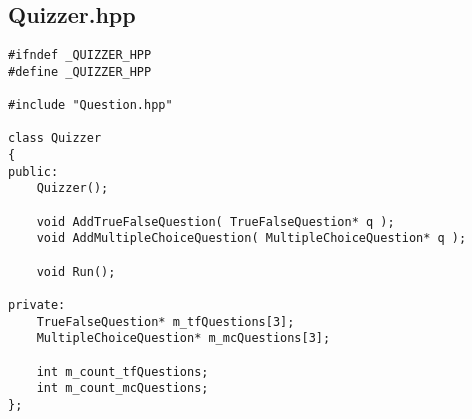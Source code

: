 \documentclass[a4paper,12pt]{book}
\begin{document}
            \subsection*{Quizzer.hpp}
\begin{lstlisting}[style=code]
#ifndef _QUIZZER_HPP
#define _QUIZZER_HPP

#include "Question.hpp"

class Quizzer
{
public:
    Quizzer();

    void AddTrueFalseQuestion( TrueFalseQuestion* q );
    void AddMultipleChoiceQuestion( MultipleChoiceQuestion* q );

    void Run();

private:
    TrueFalseQuestion* m_tfQuestions[3];
    MultipleChoiceQuestion* m_mcQuestions[3];

    int m_count_tfQuestions;
    int m_count_mcQuestions;
};
\end{lstlisting}

            
\end{document}
